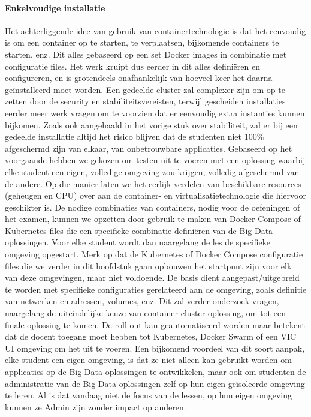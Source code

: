 \paragraph{Enkelvoudige installatie}
Het achterliggende idee van gebruik van containertechnologie is dat het eenvoudig is om een container op te starten, te verplaatsen, bijkomende containers te starten, enz. Dit alles gebaseerd op een set Docker images in combinatie met configuratie files.
\newline
Het werk kruipt dus eerder in dit alles definiëren en configureren, en is grotendeels onafhankelijk van hoeveel keer het daarna geïnstalleerd moet worden. Een gedeelde cluster zal complexer zijn om op te zetten door de security en stabiliteitsvereisten, terwijl gescheiden installaties eerder meer werk vragen om te voorzien dat er eenvoudig extra instanties kunnen bijkomen.
\newline
Zoals ook aangehaald in het vorige stuk over stabiliteit, zal er bij een gedeelde installatie altijd het risico blijven dat de studenten niet 100\% afgeschermd zijn van elkaar, van onbetrouwbare applicaties.
\newline
\newline
\newline
Gebaseerd op het voorgaande hebben we gekozen om testen uit te voeren met een oplossing waarbij elke student een eigen, volledige omgeving zou krijgen, volledig afgeschermd van de andere. Op die manier laten we het eerlijk verdelen van beschikbare resources (geheugen en CPU) over aan de container- en virtualisatietechnologie die hiervoor geschikter is.
\newline
De nodige combinaties van containers, nodig voor de oefeningen of het examen, kunnen we opzetten door gebruik te maken van Docker Compose of Kubernetes files die een specifieke combinatie definiëren van de Big Data oplossingen. Voor elke student wordt dan naargelang de les de specifieke omgeving opgestart.
\newline
Merk op dat de Kubernetes of Docker Compose configuratie files die we verder in dit hoofdstuk gaan opbouwen het startpunt zijn voor elk van deze omgevingen, maar niet voldoende. De basis dient aangepast/uitgebreid te worden met specifieke configuraties gerelateerd aan de omgeving, zoals definitie van netwerken en adressen, volumes, enz. Dit zal verder onderzoek vragen, naargelang de uiteindelijke keuze van container cluster oplossing, om tot een finale oplossing te komen.
\newline
De roll-out kan geautomatiseerd worden maar betekent dat de docent toegang moet hebben tot Kubernetes, Docker Swarm of een VIC UI omgeving om het uit te voeren.
\newline
Een bijkomend voordeel van dit soort aanpak, elke student een eigen omgeving, is dat ze niet alleen kan gebruikt worden om applicaties op de Big Data oplossingen te ontwikkelen, maar ook om studenten de administratie van de Big Data oplossingen zelf op hun eigen geïsoleerde omgeving te leren. Al is dat vandaag niet de focus van de lessen, op hun eigen omgeving kunnen ze Admin zijn zonder impact op anderen.
\newline
\newline



